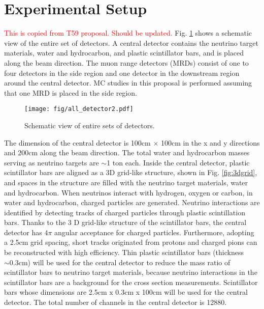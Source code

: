 \section{Experimental Setup}
\textcolor{red}{This is copied from T59 proposal. Should be updated.}
Fig. \ref{fig:all_detector} shows a schematic view of the entire set of detectors.
A central detector contains the neutrino target materials, water and hydrocarbon, and plastic scintillator bars,
and is placed along the beam direction.
The muon range detectors (MRDs) consist of one to four detectors in the side region and one detector in the downstream region
around the central detector.
MC studies in this proposal is performed assuming that one MRD is placed in the side region.

\begin{figure}[tbh]
\begin{center}
\texttt{[image: fig/all\_detector2.pdf]}
\end{center}
\caption{
Schematic view of entire sets of detectors.
}
\label{fig:all_detector}
\end{figure}


The dimension of the central detector is 100cm $\times$ 100cm in the x and y directions
and 200cm along the beam direction.
The total water and hydrocarbon masses serving as neutrino targets are $\sim$1 ton each.
Inside the central detector, plastic scintillator bars are aligned as a 3D grid-like structure, shown in Fig. \ref{fig:3dgrid},
and spaces in the structure are filled with the neutrino target materials, water and hydrocarbon.
When neutrinos interact with hydrogen, oxygen or carbon, in water and hydrocarbon,
charged particles are generated.
Neutrino interactions are identified by detecting tracks of charged particles through plastic scintillation bars.
Thanks to the 3 D grid-like structure of the scintillator bars, 
the central detector has $4\pi$ angular acceptance for charged particles.
Furthermore, adopting a 2.5cm grid spacing, short tracks originated from protons and charged pions can be reconstructed
with high efficiency.
Thin plastic scintillator bars (thickness $\sim 0.3$cm) will be used for the central detector
to reduce  the mass ratio of scintillator bars to neutrino target materials,
because neutrino interactions in the scintillator bars are a background for the cross section measurements.
Scintillator bars whose dimensions are 2.5cm x 0.3cm x 100cm will be used for the central detector.
The total number of channels in the central detector is 12880.

